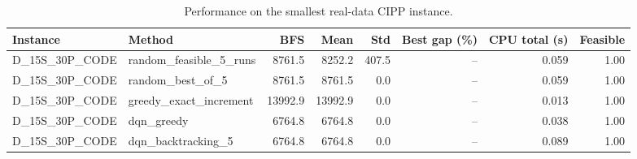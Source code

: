 \begin{table}[t]
\centering
\caption{Performance on the smallest real-data CIPP instance.}
\begin{tabular}{llrrrrrr}
\toprule
Instance & Method & BFS & Mean & Std & Best gap (\%) & CPU total (s) & Feasible \\
\midrule
D\_15S\_30P\_CODE & random\_feasible\_5\_runs & 8761.5 & 8252.2 & 407.5 & -- & 0.059 & 1.00 \\
D\_15S\_30P\_CODE & random\_best\_of\_5 & 8761.5 & 8761.5 & 0.0 & -- & 0.059 & 1.00 \\
D\_15S\_30P\_CODE & greedy\_exact\_increment & 13992.9 & 13992.9 & 0.0 & -- & 0.013 & 1.00 \\
D\_15S\_30P\_CODE & dqn\_greedy & 6764.8 & 6764.8 & 0.0 & -- & 0.038 & 1.00 \\
D\_15S\_30P\_CODE & dqn\_backtracking\_5 & 6764.8 & 6764.8 & 0.0 & -- & 0.089 & 1.00 \\
\bottomrule
\end{tabular}
\end{table}
